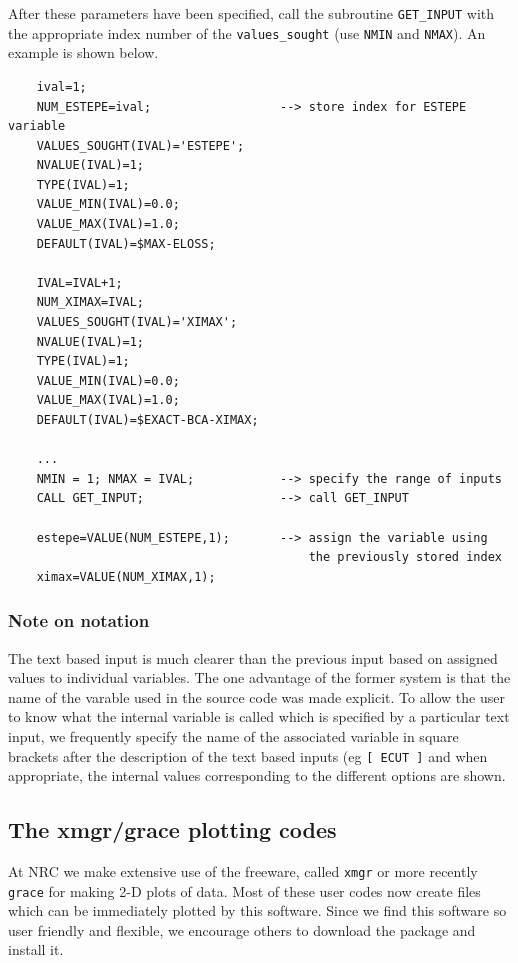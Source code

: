 \documentclass[12pt,twoside]{article}  %
\begin{document}
After these parameters have been specified, call the subroutine
\verb+GET_INPUT+ with the appropriate index number of the
\verb+values_sought+ (use \verb+NMIN+ and \verb+NMAX+).
An example is shown below.
\begin{verbatim}
    ival=1;
    NUM_ESTEPE=ival;                  --> store index for ESTEPE variable
    VALUES_SOUGHT(IVAL)='ESTEPE';
    NVALUE(IVAL)=1;
    TYPE(IVAL)=1;
    VALUE_MIN(IVAL)=0.0;
    VALUE_MAX(IVAL)=1.0;
    DEFAULT(IVAL)=$MAX-ELOSS;

    IVAL=IVAL+1;
    NUM_XIMAX=IVAL;
    VALUES_SOUGHT(IVAL)='XIMAX';
    NVALUE(IVAL)=1;
    TYPE(IVAL)=1;
    VALUE_MIN(IVAL)=0.0;
    VALUE_MAX(IVAL)=1.0;
    DEFAULT(IVAL)=$EXACT-BCA-XIMAX;

    ...
    NMIN = 1; NMAX = IVAL;            --> specify the range of inputs
    CALL GET_INPUT;                   --> call GET_INPUT

    estepe=VALUE(NUM_ESTEPE,1);       --> assign the variable using
                                          the previously stored index
    ximax=VALUE(NUM_XIMAX,1);
\end{verbatim}

\subsubsection{Note on notation}
The text based input is much clearer than the previous input based on
assigned values to individual variables. The one advantage of the former
system is that the name of the varable used in the source code was made
explicit.  To allow the user to know what the internal variable is called
which is specified by a particular text input, we frequently specify the
name of the associated variable in square brackets after the description of
the text based inputs (eg {\tt [ ECUT ]} and when appropriate, the
internal values corresponding to the different options are shown.

\subsection{The xmgr/grace plotting codes}

At NRC we make extensive use of the freeware, called {\tt xmgr} or more
recently {\tt grace} for making 2-D plots of data.  Most of these user
codes now create files which can be immediately plotted by this software.
Since we find this software so user friendly and flexible, we encourage
others to download the package and install it.
\end{document}
